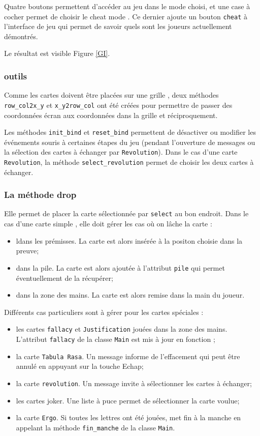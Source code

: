 \documentclass[12pt, algo]{cours}
\begin{document}
Quatre boutons permettent d'accéder au jeu dans le mode choisi, et une case à cocher permet de choisir le \og cheat mode \fg. Ce dernier ajoute un bouton \texttt{cheat} à l'interface de jeu qui permet de savoir quels sont les joueurs actuellement démontrés.

Le résultat est visible Figure \ref{GI}.

\subsubsection{outils}

Comme les cartes doivent être placées sur une \og grille \fg{},  deux méthodes \texttt{row\_col2x\_y} et \texttt{x\_y2row\_col} ont été créées pour permettre de passer des coordonnées écran aux coordonnées dans la grille et réciproquement.

Les méthodes \texttt{init\_bind} et \texttt{reset\_bind} permettent de désactiver ou modifier les événements souris à certaines étapes du jeu (pendant l'ouverture de messages ou la sélection des cartes à échanger par \texttt{Revolution}). Dans le cas d'une carte \texttt{Revolution}, la méthode \texttt{select\_revolution} permet de choisir les deux cartes à échanger.

\subsubsection{La méthode drop}

Elle permet de placer la carte sélectionnée par \texttt{select} au bon endroit. Dans le cas d'une carte \og simple \fg, elle doit gérer les cas où on lâche la carte :

\begin{itemize}
\item ldans les prémisses. La carte est alors insérée à la positon choisie dans la preuve;
\item dans la pile. La carte est alors ajoutée à l'attribut \texttt{pile} qui permet éventuellement de la récupérer;
\item dans la zone des mains. La carte est alors remise dans la main du joueur.
\end{itemize}


Différents cas particuliers sont à gérer pour les cartes spéciales :
\begin{itemize}
\item les cartes \texttt{fallacy} et \texttt{Justification} jouées dans la zone des mains. L'attribut \texttt{fallacy} de la classe \texttt{Main} est mis à jour en fonction ;
\item la carte \texttt{Tabula Rasa}. Un message informe de l'effacement qui peut être annulé en appuyant sur la touche Echap;
\item la carte \texttt{revolution}. Un message invite à sélectionner les cartes à échanger;
\item les cartes joker. Une liste à puce permet de sélectionner la carte voulue;
\item la carte \texttt{Ergo}. Si toutes les lettres ont été jouées, met fin à la manche en appelant la méthode \texttt{fin\_manche} de la classe \texttt{Main}.
\end{itemize}
\end{document}

